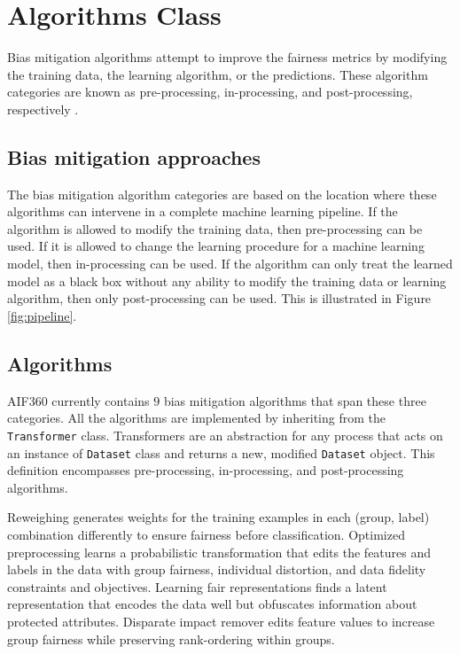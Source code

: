 \documentclass{article}
\begin{document}
\section{Algorithms Class}
\label{sec:algorithmsclass}

Bias mitigation algorithms attempt to improve the fairness metrics by modifying the training data, the learning algorithm, or the predictions. These algorithm categories are known as pre-processing, in-processing, and post-processing, respectively \citep{DalessandroOL2017}.

\subsection{Bias mitigation approaches}

The bias mitigation algorithm categories are based on the location where these algorithms can intervene in a complete machine learning pipeline. If the algorithm is allowed to modify the training data, then pre-processing can be used. If it is allowed to change the learning procedure for a machine learning model, then in-processing can be used. If the algorithm can only treat the learned model as a black box without any ability to modify the training data or learning algorithm, then only post-processing can be used. This is illustrated in Figure \ref{fig:pipeline}.

\subsection{Algorithms}

AIF360 currently contains $9$ bias mitigation algorithms that span these three categories. All the algorithms are implemented by inheriting from the \texttt{Transformer} class. Transformers are an abstraction for any process that acts on an instance of \texttt{Dataset} class and returns a new, modified \texttt{Dataset} object. This definition encompasses pre-processing, in-processing, and post-processing algorithms.

 Reweighing \citep{KamiranCalders2012} generates weights for the training examples in each (group, label) combination differently to ensure fairness before classification. Optimized preprocessing \citep{CalmonWVRV2017} learns a probabilistic transformation that edits the features and labels in the data with group fairness, individual distortion, and data fidelity constraints and objectives. Learning fair representations \citep{zemel2013fairrepresentations} finds a latent representation that encodes the data well but obfuscates information about protected attributes. Disparate impact remover \citep{FeldmanFMSV2015} edits feature values to increase group fairness while preserving rank-ordering within groups.
\end{document}
